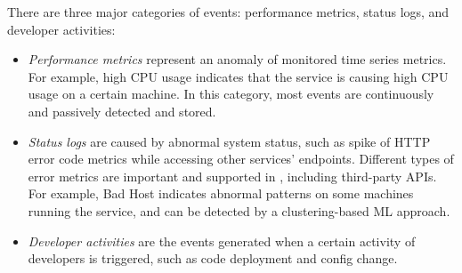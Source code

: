 There are three major categories of events: performance metrics, status logs, and developer activities:
\begin{itemize}
    \item \emph{Performance metrics} represent an anomaly of monitored time series metrics. For example, high CPU usage indicates that the service is causing high CPU usage on a certain machine. In this category, most events are continuously and passively detected and stored. %
    \item \emph{Status logs} are caused by abnormal system status, such as spike of HTTP error code metrics while accessing other services' endpoints. Different types of error metrics are important and supported in \system, including third-party APIs. For example, Bad Host indicates abnormal patterns on some machines running the service, and can be detected by a  clustering-based ML approach.%
    \item \emph{Developer activities} are the events generated when a certain activity of developers is triggered, such as code deployment and config change.
\end{itemize}

